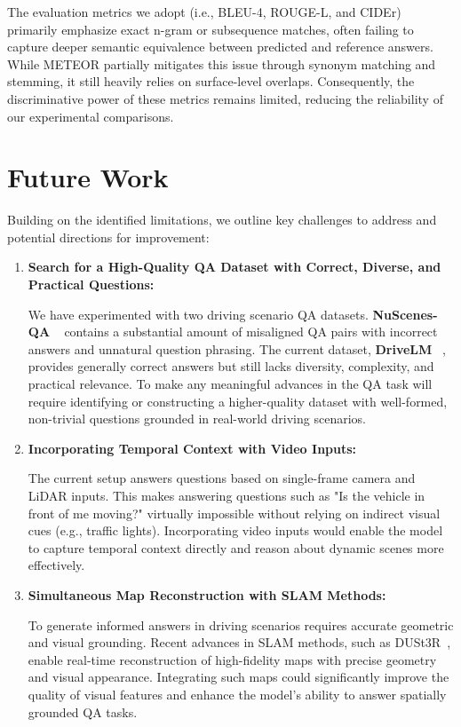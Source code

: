 \documentclass{article} %
\begin{document}
\begin{enumerate}
    The evaluation metrics we adopt (i.e., BLEU-4, ROUGE-L, and CIDEr) primarily emphasize exact n-gram or subsequence matches, often failing to capture deeper semantic equivalence between predicted and reference answers. While METEOR partially mitigates this issue through synonym matching and stemming, it still heavily relies on surface-level overlaps. Consequently, the discriminative power of these metrics remains limited, reducing the reliability of our experimental comparisons.
    
\end{enumerate}

\section{Future Work}
Building on the identified limitations, we outline key challenges to address and potential directions for improvement:
\begin{enumerate}
    \item \textbf{Search for a High-Quality QA Dataset with Correct, Diverse, and Practical Questions:}

We have experimented with two driving scenario QA datasets. \textbf{NuScenes-QA} ~\cite{qian2024nuscenes} contains a substantial amount of misaligned QA pairs with incorrect answers and unnatural question phrasing. The current dataset, \textbf{DriveLM} ~\cite{gopalkrishnan2024multi}, provides generally correct answers but still lacks diversity, complexity, and practical relevance. To make any meaningful advances in the QA task will require identifying or constructing a higher-quality dataset with well-formed, non-trivial questions grounded in real-world driving scenarios.
    \item \textbf{Incorporating Temporal Context with Video Inputs:}

    The current setup answers questions based on single-frame camera and LiDAR inputs. This makes answering questions such as "Is the vehicle in front of me moving?" virtually impossible without relying on indirect visual cues (e.g., traffic lights). Incorporating video inputs would enable the model to capture temporal context directly and reason about dynamic scenes more effectively.
    \item \textbf{Simultaneous Map Reconstruction with SLAM Methods:}

    To generate informed answers in driving scenarios requires accurate geometric and visual grounding. Recent advances in SLAM methods, such as DUSt3R~\cite{wang2024dust3rgeometric3dvision}, enable real-time reconstruction of high-fidelity maps with precise geometry and visual appearance. Integrating such maps could significantly improve the quality of visual features and enhance the model's ability to answer spatially grounded QA tasks.
\end{enumerate}
\end{document}
